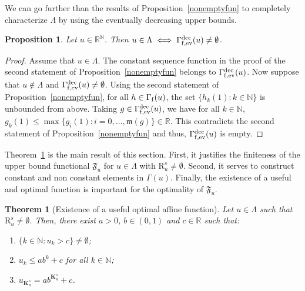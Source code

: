 \documentclass{article}
\def\funset{\Gamma}
\def\fmonfung{{\funset}_{\rm f,{\rm ev}}^{\rm dec}}
\def\mon{\mathfrak{m}}
\def\secfunh{\funset_{\rm f}}
\def\Fu{\mathfrak{F}_u}
\def\rr{\mathbb R}
\def\nn{\mathbb N}
\def\bigks{\mathbf{K}^s}
\def\gls#1{{\mathrm R}_{#1}}
\def\gsls#1{\gls{#1}^s}
\newtheorem{prop}{Proposition}
\newtheorem{theorem}{Theorem}
\begin{document}
	We can go further than the results of Proposition~\ref{nonemptyfun} to completely characterize $\Lambda$ by using the eventually decreasing upper bounds.
	\begin{prop}
		\label{nonuppbound}
		Let $u\in\rr^\nn$. Then $u\in\Lambda\iff \fmonfung(u)\neq \emptyset$.
	\end{prop}
	
	\begin{proof}
		Assume that $u\in\Lambda$. The constant sequence function in the proof of the second statement of Proposition~\ref{nonemptyfun} belongs to $\fmonfung(u)$. Now suppose that $u\notin\Lambda$ and $\fmonfung(u)\neq \emptyset$. Using the second statement of Proposition~\ref{nonemptyfun}, for all $h\in\secfunh(u)$, the set $\{h_k(1):k\in\nn\}$ is unbounded from above. Taking $g\in\fmonfung(u)$, we have for all $k\in\nn$, $g_{k}(1)\leq \max \{g_i(1): i=0,\ldots,\mon(g)\}\in\rr$. This contradicts the second statement of Proposition~\ref{nonemptyfun} and thus, $\fmonfung(u)$ is empty.
	\end{proof}
	
	Theorem~\ref{funatt} is the main result of this section. First, it justifies the finiteness of the upper bound functional $\Fu$ for $u\in\Lambda$ with $\gsls{u}\neq \emptyset$. Second, it serves to construct constant and non constant elements in $\funset(u)$. Finally, the existence of a useful and optimal function is important for the optimality of $\Fu$.
	
	\begin{theorem}[Existence of a useful optimal affine function] 
		\label{funatt}
		Let $u\in\Lambda$ such that $\gsls{u}\neq \emptyset$. Then, there exist $a>0$, $b\in (0,1)$ and $c\in\rr$ such that:
		\begin{enumerate}
			\item $\{k\in\nn : u_k>c\}\neq \emptyset$;
			\item $u_k\leq a b^k+c$ for all $k\in\nn$;
			\item $u_{\bigks_u}=ab^{\bigks_u}+c$.
		\end{enumerate}
	\end{theorem}
	
\end{document}
